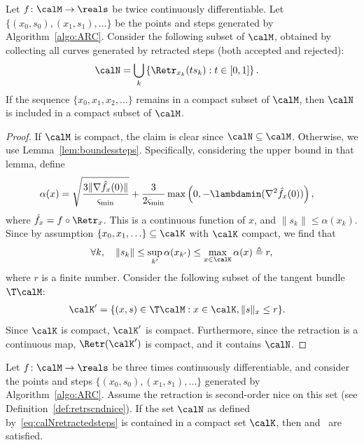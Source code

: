 \begin{lemma}\label{lem:calNsubsetcompact}
	Let $f \colon \calM \to \reals$ be twice continuously differentiable. %
	Let $\{ (x_0, s_0), (x_1, s_1), \ldots \}$ be the points and steps generated by Algorithm~\ref{algo:ARC}.
	Consider the following subset of $\calM$, obtained by collecting all curves generated by retracted steps (both accepted and rejected):
	\begin{align}
		\calN & = \bigcup_{k} \left\{ \Retr_{x_k}(ts_k) : t \in [0, 1] \right\}.
		\label{eq:calNretractedsteps}
	\end{align}
	If the sequence $\{x_0, x_1, x_2, \ldots\}$ remains in a compact subset of $\calM$, then $\calN$ is included in a compact subset of $\calM$.
\end{lemma}
\begin{proof}
	If $\calM$ is compact, the claim is clear since $\calN \subseteq \calM$. Otherwise, we use Lemma~\ref{lem:boundessteps}. Specifically, considering the upper bound in that lemma, define
	\begin{align*}
		\alpha(x) & = \sqrt{\frac{3 \|\nabla \hat f_x(0)\|}{\varsigma_{\min}}} + \frac{3}{2\varsigma_{\min}} \max\left(0, -\lambdamin(\nabla^2 \hat f_x(0))\right),
	\end{align*}
	where $\hat f_x = f \circ \Retr_x$. This is a continuous function of $x$, and $\|s_k\| \leq \alpha(x_k)$. Since by assumption $\{x_0, x_1, \ldots\} \subseteq \calK$ with $\calK$ compact, we find that
	\begin{align*}
		\forall k, \quad \|s_k\| \leq \sup_{k'} \alpha(x_{k'}) \leq \max_{x \in \calK} \alpha(x) \triangleq r,
	\end{align*}
	where $r$ is a finite number. Consider the following subset of the tangent bundle $\T\calM$:
	\begin{align*}
		\calK' & = \{ (x, s) \in \T\calM : x \in \calK, \|s\|_x \leq r \}.
	\end{align*}
	Since $\calK$ is compact, $\calK'$ is compact. %
	Furthermore, since the retraction is a continuous map, $\Retr(\calK')$ is compact, and it contains $\calN$.
\end{proof}
\begin{lemma} \label{lem:coreOfThmAboutA2}
	Let $f \colon \calM \to \reals$ be three times continuously differentiable, and consider the points and steps $\{(x_0, s_0), (x_1, s_1), \ldots \}$ generated by Algorithm~\ref{algo:ARC}.
	Assume the retraction is second-order nice on this set (see Definition~\ref{def:retrscndnice}).
	If the set $\calN$ as defined by~\eqref{eq:calNretractedsteps} is contained in a compact set $\calK$, then  and~ are satisfied.
\end{lemma}
